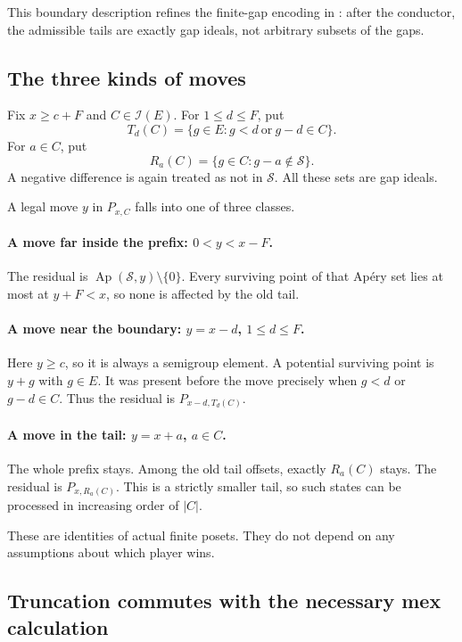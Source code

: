 \documentclass[11pt,letterpaper]{article}
\numberwithin{equation}{section}
\theoremstyle{definition}
\newcommand{\Sg}{\mathcal S}
\newcommand{\Ap}{\operatorname{Ap}}
\begin{document}
This boundary description refines the finite-gap encoding in
\cite[Section~6]{GMK}: after the conductor, the admissible tails are exactly
gap ideals, not arbitrary subsets of the gaps.

\subsection{The three kinds of moves}

Fix $x\geq c+F$ and $C\in\mathcal I(E)$. For $1\leq d\leq F$, put
\begin{equation}\label{eq:T}
 T_d(C)=\{g\in E:g<d\ \text{or}\ g-d\in C\}.
\end{equation}
For $a\in C$, put
\begin{equation}\label{eq:R}
 R_a(C)=\{g\in C:g-a\notin\Sg\}.
\end{equation}
A negative difference is again treated as not in $\Sg$.
All these sets are gap ideals.

A legal move $y$ in $P_{x,C}$ falls into one of three classes.

\paragraph{A move far inside the prefix: $0<y<x-F$.}
The residual is $\Ap(\Sg,y)\setminus\{0\}$. Every surviving point of that
Ap\'ery set lies at most at $y+F<x$, so none is affected by the old tail.

\paragraph{A move near the boundary: $y=x-d$, $1\leq d\leq F$.}
Here $y\geq c$, so it is always a semigroup element. A potential surviving
point is $y+g$ with $g\in E$. It was present before the move precisely
when $g<d$ or $g-d\in C$. Thus the residual is
$P_{x-d,T_d(C)}$.

\paragraph{A move in the tail: $y=x+a$, $a\in C$.}
The whole prefix stays. Among the old tail offsets, exactly $R_a(C)$ stays.
The residual is $P_{x,R_a(C)}$. This is a strictly smaller tail, so such
states can be processed in increasing order of $|C|$.

These are identities of actual finite posets. They do not depend on any
assumptions about which player wins.

\subsection{Truncation commutes with the necessary mex calculation}
\end{document}
